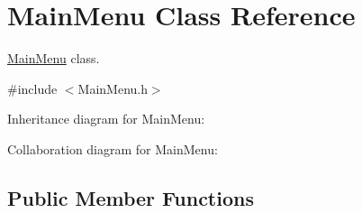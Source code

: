 \hypertarget{classMainMenu}{}\section{Main\+Menu Class Reference}
\label{classMainMenu}


\hyperlink{classMainMenu}{Main\+Menu} class.  




{\ttfamily \#include $<$Main\+Menu.\+h$>$}



Inheritance diagram for Main\+Menu\+:


Collaboration diagram for Main\+Menu\+:
\subsection*{Public Member Functions}
